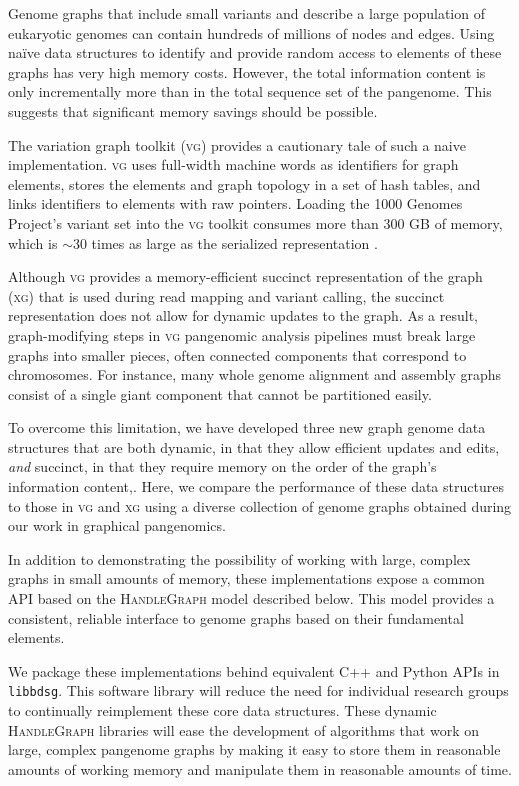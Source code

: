 \documentclass{article}
\begin{document}
Genome graphs that include small variants and describe a large population of eukaryotic genomes can contain hundreds of millions of nodes and edges.
Using na\"ive data structures to identify and provide random access to elements of these graphs has very high memory costs.
However, the total information content is only incrementally more than in the total sequence set of the pangenome.
This suggests that significant memory savings should be possible.

The variation graph toolkit (\textsc{vg}) \cite{Garrison_2018} provides a cautionary tale of such a naive implementation.
\textsc{vg} uses full-width machine words as identifiers for graph elements, stores the elements and graph topology in a set of hash tables, and links identifiers to elements with raw pointers.
Loading the 1000 Genomes Project's variant set into the \textsc{vg} toolkit consumes more than 300 GB of memory, which is $\sim$30 times as large as the serialized representation \cite{Garrison_2019}.

Although \textsc{vg} provides a memory-efficient succinct representation of the graph (\textsc{xg}) that is used during read mapping and variant calling, the succinct representation does not allow for dynamic updates to the graph.
As a result, graph-modifying steps in \textsc{vg} pangenomic analysis pipelines must break large graphs into smaller pieces, often connected components that correspond to chromosomes.
For instance, many whole genome alignment and assembly graphs consist of a single giant component that cannot be partitioned easily.

To overcome this limitation, we have developed three new graph genome data structures that are both dynamic, in that they allow efficient updates and edits, \emph{and} succinct, in that they require memory on the order of the graph's information content,.
Here, we compare the performance of these data structures to those in \textsc{vg} and \textsc{xg} using a diverse collection of genome graphs obtained during our work in graphical pangenomics.

In addition to demonstrating the possibility of working with large, complex graphs in small amounts of memory, these implementations expose a common API based on the \textsc{HandleGraph} model described below.
This model provides a consistent, reliable interface to genome graphs based on their fundamental elements.

We package these implementations behind equivalent C++ and Python APIs in \texttt{libbdsg}.
This software library will reduce the need for individual research groups to continually reimplement these core data structures.
These dynamic \textsc{HandleGraph} libraries will ease the development of algorithms that work on large, complex pangenome graphs by making it easy to store them in reasonable amounts of working memory and manipulate them in reasonable amounts of time.
\end{document}
